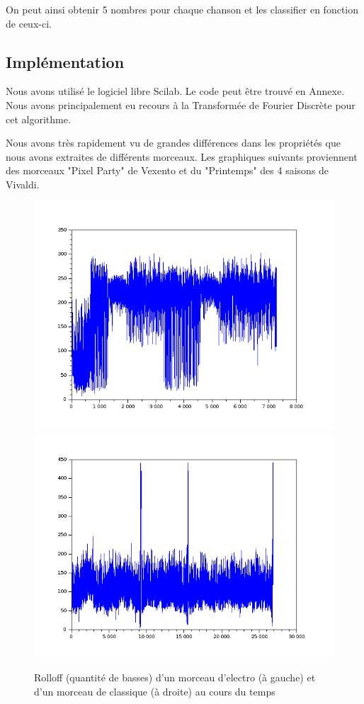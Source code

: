 \documentclass[a4paper]{article}
\begin{document}
On peut ainsi obtenir 5 nombres pour chaque chanson et les classifier en fonction de ceux-ci.

\subsection{Implémentation}

Nous avons utilisé le logiciel libre Scilab. Le code peut être trouvé en Annexe. Nous avons principalement eu recours à la Transformée de Fourier Discrète pour cet algorithme.

Nous avons très rapidement vu de grandes différences dans les propriétés que nous avons extraites de différents morceaux. Les graphiques suivants proviennent des morceaux "Pixel Party" de Vexento et du "Printemps" des 4 saisons de Vivaldi.

\newpage
\begin{figure}[h!]
\begin{center}
\includegraphics[scale=0.3]{../vexentorolloff.png}
\includegraphics[scale=0.3]{../vivaldirolloff.png}
\caption{Rolloff (quantité de basses) d'un morceau d'electro (à gauche) et d'un morceau de classique (à droite) au cours du temps}
\end{center}
\end{figure}
\end{document}
